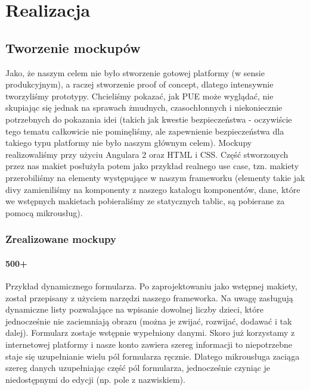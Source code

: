 \documentclass[licencjacka]{pracamgr}
\begin{document}
\chapter{Realizacja}

\section{Tworzenie mockupów}
Jako, że naszym celem nie było stworzenie gotowej platformy (w sensie produkcyjnym), a raczej stworzenie proof of concept,
dlatego intensywnie tworzyliśmy prototypy. Chcieliśmy pokazać, jak PUE może wyglądać, nie skupiając się jednak na
sprawach żmudnych, czasochłonnych i niekoniecznie potrzebnych do pokazania idei (takich jak kwestie bezpieczeństwa - oczywiście
tego tematu całkowicie nie pominęliśmy, ale zapewnienie bezpieczeństwa dla takiego typu platformy nie było naszym głównym celem).
Mockupy realizowaliśmy przy użyciu Angulara 2 oraz HTML i CSS. Część stworzonych przez nas makiet posłużyła potem jako przykład
realnego use case, tzn. makiety przerobiliśmy na elementy występujące w naszym frameworku (elementy takie jak divy zamieniliśmy na
komponenty z naszego katalogu komponentów, dane, które we wstępnych makietach pobieraliśmy ze statycznych tablic, są pobierane za
pomocą mikrousług). 

\subsection{Zrealizowane mockupy}
\subsubsection{500+}
Przykład dynamicznego formularza. Po zaprojektowaniu jako wstępnej makiety, został przepisany
z użyciem narzędzi naszego frameworka. Na uwagę zasługują dynamiczne listy pozwalające
na wpisanie dowolnej liczby dzieci, które jednocześnie nie zaciemniają obrazu (można je zwijać, rozwijać, dodawać i tak dalej).
Formularz zostaje wstępnie wypełniony danymi. Skoro już korzystamy z internetowej platformy i nasze konto
zawiera szereg informacji to niepotrzebne staje się uzupełnianie wielu pól formularza ręcznie. Dlatego
mikrousługa zaciąga szereg danych uzupełniając część pól formularza, jednocześnie czyniąc je niedostępnymi do edycji (np. pole z nazwiskiem).
\end{document}
